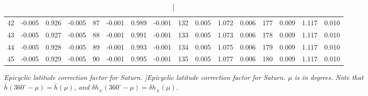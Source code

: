 \begin{table}
{\begin{tabular}{rrrr|rrrr|rrrr|crrr}
 42 & \tiny{ -0.005} &   0.926 & \tiny{ -0.005} &  87 & \tiny{ -0.001} &   0.989 & \tiny{ -0.001} & 132 & \tiny{  0.005} &   1.072 & \tiny{  0.006} & 177 & \tiny{  0.009} &   1.117 & \tiny{  0.010}\\
 43 & \tiny{ -0.005} &   0.927 & \tiny{ -0.005} &  88 & \tiny{ -0.001} &   0.991 & \tiny{ -0.001} & 133 & \tiny{  0.005} &   1.073 & \tiny{  0.006} & 178 & \tiny{  0.009} &   1.117 & \tiny{  0.010}\\
 44 & \tiny{ -0.005} &   0.928 & \tiny{ -0.005} &  89 & \tiny{ -0.001} &   0.993 & \tiny{ -0.001} & 134 & \tiny{  0.005} &   1.075 & \tiny{  0.006} & 179 & \tiny{  0.009} &   1.117 & \tiny{  0.010}\\
 45 & \tiny{ -0.005} &   0.929 & \tiny{ -0.005} &  90 & \tiny{ -0.001} &   0.995 & \tiny{ -0.001} & 135 & \tiny{  0.005} &   1.077 & \tiny{  0.006} & 180 & \tiny{  0.009} &   1.117 & \tiny{  0.010}\\
\end{tabular}}
\caption[\em  Epicyclic latitude correction factor for Saturn. ]{\em Epicyclic latitude correction factor for Saturn. $\mu$ is in degrees. Note that $\bar{h}(360^\circ-\mu) = \bar{h}(\mu)$, and $\delta h_{\pm}(360^\circ-\mu) = \delta h_{\pm}(\mu)$. }\label{tlat2s}
\end{table}


